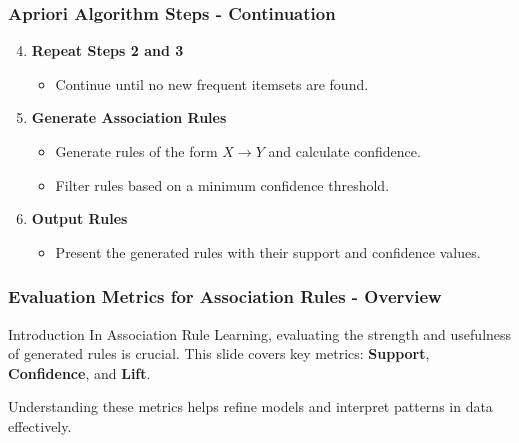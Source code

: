 \documentclass[aspectratio=169]{beamer}
\begin{document}
\begin{frame}[fragile]
    \frametitle{Apriori Algorithm Steps - Continuation}
    \begin{enumerate}
        \setcounter{enumi}{3} %
        \item \textbf{Repeat Steps 2 and 3}
            \begin{itemize}
                \item Continue until no new frequent itemsets are found.
            \end{itemize}
        \item \textbf{Generate Association Rules}
            \begin{itemize}
                \item Generate rules of the form \(X \rightarrow Y\) and calculate confidence.
                \item Filter rules based on a minimum confidence threshold.
            \end{itemize}
        \item \textbf{Output Rules}
            \begin{itemize}
                \item Present the generated rules with their support and confidence values.
            \end{itemize}
    \end{enumerate}
\end{frame}

\begin{frame}[fragile]
    \frametitle{Evaluation Metrics for Association Rules - Overview}
    
    \begin{block}{Introduction}
        In Association Rule Learning, evaluating the strength and usefulness of generated rules is crucial. This slide covers key metrics: \textbf{Support}, \textbf{Confidence}, and \textbf{Lift}.
    \end{block}
    
    Understanding these metrics helps refine models and interpret patterns in data effectively.
\end{frame}
\end{document}
